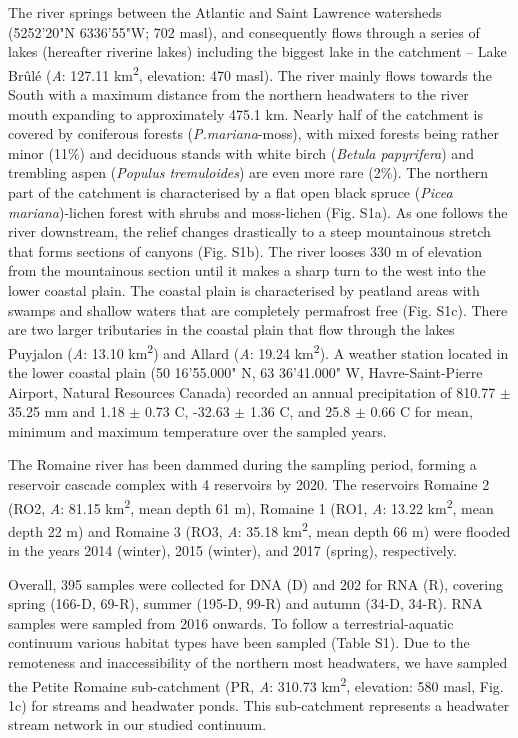 \documentclass[12pt,a4paper]{article} %
\begin{document}
The river springs between the Atlantic and Saint Lawrence watersheds (52\textdegree{}52'20"N 63\textdegree{}36'55"W; 702 masl), and consequently flows through a series of lakes (hereafter riverine lakes) including the biggest lake in the catchment – Lake Br\^{u}l\'{e} (\textit{A}: 127.11 km\textsuperscript{2}, elevation: 470 masl). The river mainly flows towards the South with a maximum distance from the northern headwaters to the river mouth expanding to approximately 475.1 km. Nearly half of the catchment is covered by coniferous forests (\textit{P.mariana}-moss), with mixed forests being rather minor (11\%) and deciduous stands with white birch (\textit{Betula papyrifera}) and trembling aspen (\textit{Populus tremuloides}) are even more rare (2\%)\citep{HQreport2009}. The northern part of the catchment is characterised by a flat open black spruce (\textit{Picea mariana})-lichen forest with shrubs and moss-lichen (Fig. S1a). As one follows the river downstream, the relief changes drastically to a steep mountainous stretch that forms sections of canyons (Fig. S1b). The river looses 330 m of elevation from the mountainous section until it makes a sharp turn to the west into the lower coastal plain. The coastal plain is characterised by peatland areas with swamps and shallow waters that are completely permafrost free (Fig. S1c). There are two larger tributaries in the coastal plain that flow through the lakes Puyjalon (\textit{A}: 13.10 km\textsuperscript{2}) and Allard (\textit{A}: 19.24 km\textsuperscript{2}). A weather station located in the lower coastal plain (50\textdegree{} 16'55.000" N, 63\textdegree{} 36'41.000" W, Havre-Saint-Pierre Airport, Natural Resources Canada) recorded an annual precipitation of 810.77 $\pm$ 35.25 mm and 1.18 $\pm$ 0.73 \textdegree{}C, -32.63 $\pm$ 1.36 \textdegree{}C, and 25.8 $\pm$ 0.66 \textdegree{}C for mean, minimum and maximum temperature over the sampled years. 

The Romaine river has been dammed during the sampling period, forming a reservoir cascade complex with 4 reservoirs by 2020. The reservoirs Romaine 2 (RO2, \textit{A}: 81.15 km\textsuperscript{2}, mean depth 61 m), Romaine 1 (RO1, \textit{A}: 13.22 km\textsuperscript{2}, mean depth 22 m) and Romaine 3 (RO3, \textit{A}: 35.18 km\textsuperscript{2}, mean depth 66 m) were flooded in the years 2014 (winter), 2015 (winter), and 2017 (spring), respectively.

Overall, 395 samples were collected for DNA (D) and 202 for RNA (R), covering spring (166-D, 69-R), summer (195-D, 99-R) and autumn (34-D, 34-R). RNA samples were sampled from 2016 onwards. To follow a terrestrial-aquatic continuum various habitat types have been sampled (Table S1). Due to the remoteness and inaccessibility of the northern most headwaters, we have sampled the Petite Romaine sub-catchment (PR, \textit{A}: 310.73 km\textsuperscript{2}, elevation: 580 masl, Fig. 1c) for streams and headwater ponds. This sub-catchment represents a headwater stream network in our studied continuum. 
\end{document}
